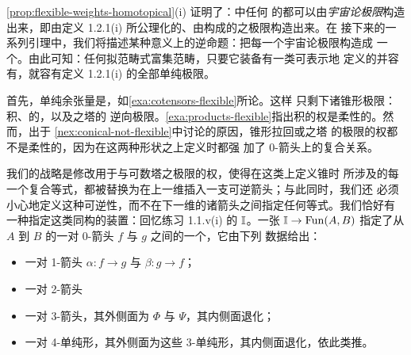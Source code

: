 \cref{prop:flexible-weights-homotopical}(i) 证明了：\trInfinityCosmos{}中任何%
\trDiagram{}的\trFlexibleWeightedLimit{}都可以由\emph{宇宙论极限}构造出来，即由定义
1.2.1(i) 所公理化的、由\trIsofibration{}构成的\trDiagram{}之极限构造出来。在
接下来的一系列引理中，我们将描述某种意义上的逆命题：把每一个宇宙论极限构造成
一个\trFlexibleWeightedLimit{}。由此可知：任何拟范畴式富集范畴，只要它装备有一类可表示地
定义的\trIsofibration{}并容有\trFlexibleWeightedLimit{}，就容有定义 1.2.1(i) 的全部单纯极限。

首先，单纯余张量是\trFlexibleWeightedLimit{}，如\cref{exa:cotensors-flexible}所论。这样
只剩下诸锥形极限：积、\trIsofibration{}的\trPullback，以及\trIsofibration{}之塔的
逆向极限。\cref{exa:products-flexible}指出积的权是柔性的。然而，出于
\cref{nex:conical-not-flexible}中讨论的原因，锥形拉回或\trIsofibration{}之塔
的极限的权都不是柔性的，因为在这两种\trDiagram{}形状之上定义\trCone{}时都强
加了 0-箭头上的复合关系。

我们的战略是修改用于\trPullback{}与可数塔之极限的权，使得在这类\trDiagram{}上定义锥时
所涉及的每一个复合等式，都被替换为在上一维插入一支可逆箭头；与此同时，我们还
必须小心地定义这种可逆性，而不在下一维的诸箭头之间指定任何等式。我们恰好有
一种指定这类同构的装置：回忆练习 1.1.v(i) 的\trHomotopyCoherentIsomorphism{}
$\mathbb{I}$。一张\trDiagram{} $\mathbb{I}\to\mathrm{Fun}(A,B)$ 指定了从 $A$ 到 $B$
的一对 0-箭头 $f$ 与 $g$ 之间的一个\trHomotopyCoherentIsomorphism，它由下列
数据给出：
\begin{itemize}
\item 一对 1-箭头 $\alpha\colon f\to g$ 与 $\beta\colon g\to f$；
\item 一对 2-箭头
\begin{center}
\end{center}
\item 一对 3-箭头，其外侧面为 $\Phi$ 与 $\Psi$，其内侧面退化；
\item 一对 4-单纯形，其外侧面为这些 3-单纯形，其内侧面退化，依此类推。
\end{itemize}

